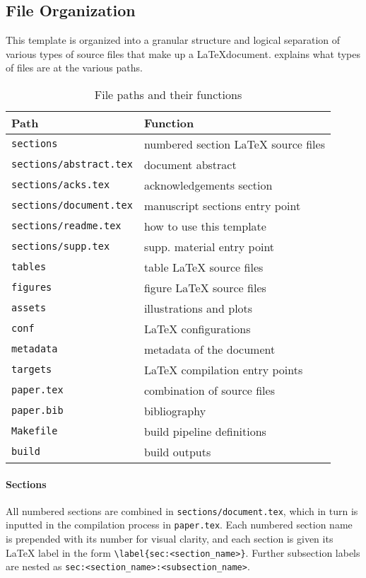 \subsection{File Organization}

This template is organized into a granular structure and logical separation of various types of source files that make up a \LaTeX document.
 explains what types of files are at the various paths.
%
\begin{table}[h]
    \caption{File paths and their functions}
    \label{tab:howto:path-description}
    \begin{tabular}{ll}
        \toprule
        Path & Function\\
        \midrule
        \texttt{sections} & numbered section \LaTeX\xspace source files\\
        \texttt{sections/abstract.tex} & document abstract\\
        \texttt{sections/acks.tex} & acknowledgements section\\
        \texttt{sections/document.tex} & manuscript sections entry point\\
        \texttt{sections/readme.tex} & how to use this template\\
        \texttt{sections/supp.tex} & supp. material entry point\\
        \texttt{tables} & table \LaTeX\xspace source files\\
        \texttt{figures} & figure \LaTeX\xspace source files\\
        \texttt{assets} & illustrations and plots\\
        \texttt{conf} & \LaTeX\xspace configurations\\
        \texttt{metadata} & metadata of the document\\
        \texttt{targets} & \LaTeX\xspace compilation entry points\\
        \texttt{paper.tex} & combination of source files\\
        \texttt{paper.bib} & bibliography\\
        \texttt{Makefile} & build pipeline definitions\\
        \texttt{build} & build outputs\\
        \bottomrule
    \end{tabular}
\end{table}

\paragraph{Sections}
All numbered sections are combined in \texttt{sections/docu\hfill\break ment.tex}, which in turn is inputted in the compilation process in \texttt{paper.tex}.
Each numbered section name is prepended with its number for visual clarity, and each section is given its \LaTeX\xspace label in the form \texttt{\textbackslash label\{sec:<section\_name>\}}.
Further subsection labels are nested as \texttt{sec:<section\_name>:<subsection\_name>}.


